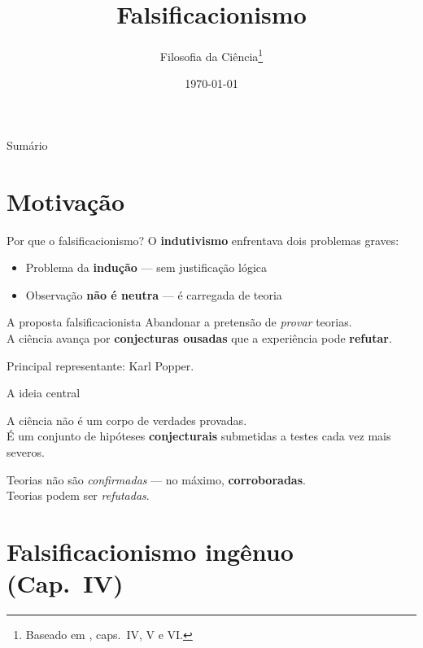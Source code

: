 \documentclass[aspectratio=169]{beamer}
\title{Falsificacionismo}
\author{Filosofia da Ciência\footnote{Baseado em \citet{chalmers1993}, caps.~IV, V e VI.}}
\date{\today}
\newcommand{\impt}[1]{\textcolor{maccent}{\textbf{#1}}}
\newcommand{\ntc}[1]{\textcolor{mprimary}{#1}}
\begin{document}
\begin{frame}[plain]\titlepage\end{frame}

\begin{frame}{Sumário}\tableofcontents\end{frame}

\section{Motivação}

\begin{frame}{Por que o falsificacionismo?}
O \impt{indutivismo} enfrentava dois problemas graves:
\vspace{0.3cm}
\begin{itemize}
  \item Problema da \impt{indução} --- sem justificação lógica
  \item Observação \impt{não é neutra} --- é carregada de teoria
\end{itemize}
\pause
\vspace{0.5cm}
\begin{block}{A proposta falsificacionista}
Abandonar a pretensão de \emph{provar} teorias. \\
A ciência avança por \impt{conjecturas ousadas} que a experiência pode \impt{refutar}.
\end{block}
\pause
\vspace{0.3cm}
\ntc{Principal representante:} Karl Popper.
\end{frame}

\begin{frame}{A ideia central}
\begin{alertblock}{}
A ciência não é um corpo de verdades provadas. \\
É um conjunto de hipóteses \impt{conjecturais} submetidas a testes cada vez mais severos.
\end{alertblock}
\vspace{0.5cm}
\pause
Teorias não são \emph{confirmadas} --- no máximo, \impt{corroboradas}. \\
Teorias podem ser \emph{refutadas}.
\end{frame}

\section{Falsificacionismo ingênuo (Cap.~IV)}
\end{document}

